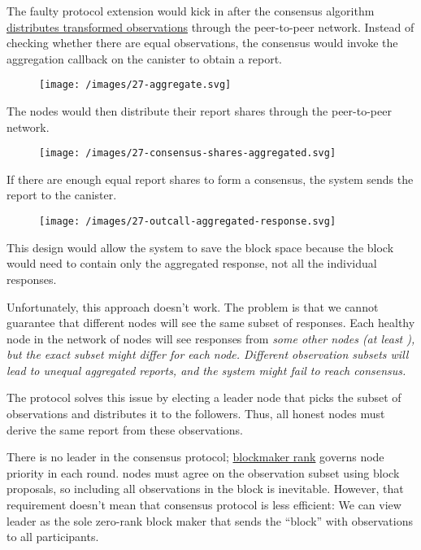 \documentclass{article}
\begin{document}
The faulty protocol extension would kick in after the consensus algorithm \href{#fig-consensus-shares-transformed}{distributes transformed observations} through the peer-to-peer network.
Instead of checking whether there are  equal observations, the consensus would invoke the aggregation callback on the canister to obtain a report.

\begin{figure}[grayscale-diagram,p75]
\texttt{[image: /images/27-aggregate.svg]}
\end{figure}

The nodes would then distribute their report shares through the peer-to-peer network.

\begin{figure}[grayscale-diagram,p75]
\texttt{[image: /images/27-consensus-shares-aggregated.svg]}
\end{figure}

If there are enough equal report shares to form a consensus, the system sends the report to the canister.

\begin{figure}[grayscale-diagram,p75]
\texttt{[image: /images/27-outcall-aggregated-response.svg]}
\end{figure}

This design would allow the system to save the block space because the block would need to contain only the aggregated response, not all the individual responses.

Unfortunately, this approach doesn't work.
The problem is that we cannot guarantee that different nodes will see the same subset of responses.
Each healthy node in the network of  nodes will see responses from \em{some} other nodes (at least ), but the exact subset might differ for each node.
Different observation subsets will lead to unequal aggregated reports, and the system might fail to reach consensus.

The  protocol solves this issue by electing a leader node that picks the subset of observations and distributes it to the followers.
Thus, all honest nodes must derive the same report from these observations.

There is no leader in the  consensus protocol; \href{https://internetcomputer.org/how-it-works/consensus/#block-making}{blockmaker rank} governs node priority in each round.
 nodes must agree on the observation subset using block proposals, so including all observations in the block is inevitable.
However, that requirement doesn't mean that  consensus protocol is less efficient: We can view  leader as the sole zero-rank block maker that sends the ``block'' with observations to all participants.
\end{document}
